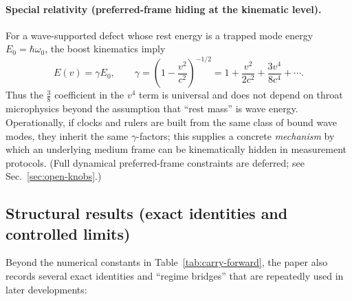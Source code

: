 \documentclass[11pt]{article}
\begin{document}
\paragraph{Special relativity (preferred-frame hiding at the kinematic level).}
For a wave-supported defect whose rest energy is a trapped mode energy \(E_0=\hbar\omega_0\), the boost kinematics imply
\[
E(v)=\gamma E_0,
\qquad
\gamma = \left(1-\frac{v^2}{c^2}\right)^{-1/2}
=1+\frac{v^2}{2c^2}+\frac{3v^4}{8c^4}+\cdots.
\]
Thus the \(\tfrac{3}{8}\) coefficient in the \(v^4\) term is universal and does not depend on throat microphysics beyond the assumption that ``rest mass'' is wave energy.
Operationally, if clocks and rulers are built from the same class of bound wave modes, they inherit the same \(\gamma\)-factors; this supplies a concrete \emph{mechanism} by which an underlying medium frame can be kinematically hidden in measurement protocols.
(Full dynamical preferred-frame constraints are deferred; see Sec.~\ref{sec:open-knobs}.)

\subsection{Structural results (exact identities and controlled limits)}
Beyond the numerical constants in Table~\ref{tab:carry-forward}, the paper also records several exact identities and ``regime bridges'' that are repeatedly used in later developments:
\end{document}
